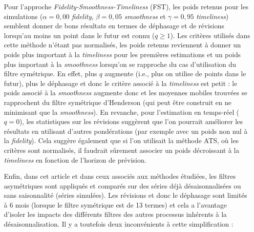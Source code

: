 \documentclass[
  12pt,
  a4paper,french]{article}
\newcommand\1{\mathds{1}}
\begin{document}
Pour l'approche \emph{Fidelity-Smoothness-Timeliness} (FST), les poids retenus pour les simulations (\(\alpha = 0,00\) \emph{fidelity}, \(\beta =0,05\) \emph{smoothness} et \(\gamma = 0,95\) \emph{timeliness}) semblent donner de bons résultats en termes de déphasage et de révisions lorsqu'au moins un point dans le futur est connu (\(q\geq1\)).
Les critères utilisés dans cette méthode n'étant pas normalisés, les poids retenus reviennent à donner un poids plus important à la \emph{timeliness} pour les premières estimations et un poids plus important à la \emph{smoothness} lorsqu'on se rapproche du cas d'utilisation du filtre symétrique.
En effet, plus \(q\) augmente (i.e., plus on utilise de points dans le futur), plus le déphasage et donc le critère associé à la \emph{timeliness} est petit : le poids associé à la \emph{smoothness} augmente donc et les moyennes mobiles trouvées se rapprochent du filtre symétrique d'Henderson (qui peut être construit en ne minimisant que la \emph{smoothness}).
En revanche, pour l'estimation en temps-réel (\(q=0\)), les statistiques sur les révisions suggèrent que l'on pourrait améliorer les résultats en utilisant d'autres pondérations (par exemple avec un poids non nul à la \emph{fidelity}).
Cela suggère également que si l'on utilisait la méthode ATS, où les critères sont normalisés, il faudrait sûrement associer un poids décroissant à la \emph{timeliness} en fonction de l'horizon de prévision.

Enfin, dans cet article et dans ceux associés aux méthodes étudiées, les filtres asymétriques sont appliqués et comparés sur des séries déjà désaisonnalisées ou sans saisonnalité (séries simulées).
Les révisions et donc le déphasage sont limités à 6 mois (lorsque le filtre symétrique est de 13 termes) et cela a l'avantage d'isoler les impacts des différents filtres des autres processus inhérents à la désaisonnalisation.
Il y a toutefois deux inconvénients à cette simplification :
\end{document}
